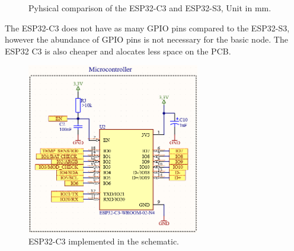         \begin{figure}[H]%
            \centering
            \qquad
            \caption{Pyhsical comparison of the ESP32-C3 and ESP32-S3, Unit in mm.}%
            \label{fig:example}%
        \end{figure}

        The ESP32-C3 does not have as many GPIO pins compared to the ESP32-S3, however the 
        abundance of GPIO pins is not necessary for the basic node. The ESP32 C3 is also 
        cheaper and alocates less space on the PCB.

        \begin{figure}[H]
            \centering
            \includegraphics[height = 7.5cm]{assets/HW/ESP32-C3-schematic.png}
            \caption{ESP32-C3 implemented in the schematic.}
        \end{figure}


